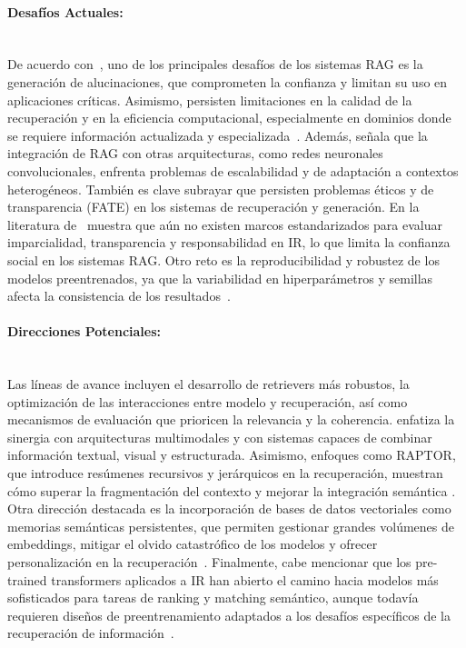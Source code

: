 \paragraph{Desafíos Actuales:} 
\mbox{}\\
De acuerdo con~\textcite{zhai2024llmIR}, uno de los principales desafíos de los sistemas RAG es la generación de alucinaciones, que comprometen la confianza y 
limitan su uso en aplicaciones críticas. Asimismo, persisten limitaciones en la calidad de la recuperación y en la eficiencia computacional, especialmente 
en dominios donde se requiere información actualizada y especializada~\parencite{hu2024ragrau}. Además, \textcite{ramdurai2025llm} señala que la integración de RAG con otras
arquitecturas, como redes neuronales convolucionales, enfrenta problemas de escalabilidad y de adaptación a contextos heterogéneos. También es clave subrayar que persisten problemas éticos y de transparencia (FATE) en los sistemas de recuperación y generación.
En la literatura de~\textcite{bernard2025fate} muestra que aún no existen marcos estandarizados para evaluar imparcialidad, transparencia y responsabilidad en IR, lo que limita la confianza social en los sistemas RAG. 
Otro reto es la reproducibilidad y robustez de los modelos preentrenados, ya que la variabilidad en hiperparámetros y semillas afecta la consistencia de los resultados~\parencite{fan2021pretraining}.

\paragraph{Direcciones Potenciales:}  
\mbox{}\\
Las líneas de avance incluyen el desarrollo de retrievers más robustos, la optimización de las interacciones entre modelo y recuperación, 
así como mecanismos de evaluación que prioricen la relevancia y la coherencia. \textcite{ramdurai2025llm} enfatiza la sinergia con arquitecturas multimodales y con sistemas 
capaces de combinar información textual, visual y estructurada. Asimismo, enfoques como RAPTOR, que introduce resúmenes recursivos y jerárquicos en la recuperación,
muestran cómo superar la fragmentación del contexto y mejorar la integración semántica \parencite{sarthi2024raptor}. Otra dirección destacada es la incorporación de 
bases de datos vectoriales como memorias semánticas persistentes, que permiten gestionar grandes volúmenes de embeddings, mitigar el olvido catastrófico de los modelos
 y ofrecer personalización en la recuperación~\parencite{jing2024vecdb}.
Finalmente, cabe mencionar que los pre-trained transformers aplicados a IR han abierto el camino hacia modelos más sofisticados para tareas de ranking y matching semántico, 
aunque todavía requieren diseños de preentrenamiento adaptados a los desafíos específicos de la recuperación de información~\parencite{fan2021pretraining}.

